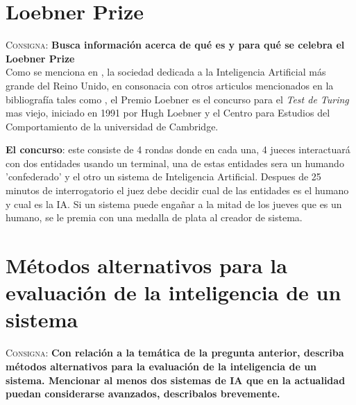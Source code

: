 \documentclass{article}
\begin{document}
\section{Loebner Prize}
\label{sec:lp}
\textsc{Consigna}: \textbf{Busca informaci\'on acerca de qu\'e es y para qu\'e se celebra el Loebner Prize}\\

Como se menciona en \cite{loebner1}, la sociedad dedicada a la Inteligencia Artificial m\'as grande del Reino Unido, en consonacia con otros articulos mencionados en la bibliograf\'ia tales como \cite{loebner2} \cite{loebner3}, el Premio Loebner es el concurso para el \textit{Test de Turing} mas viejo, iniciado en 1991 por Hugh Loebner y el Centro para Estudios del Comportamiento de la universidad de Cambridge.

\textbf{El concurso}: este consiste de 4 rondas donde en cada una, 4 jueces interactuar\'a con dos entidades usando un terminal, una de estas entidades sera un humando 'confederado' y el otro un sistema de Inteligencia Artificial. Despues de 25 minutos de interrogatorio el juez debe decidir cual de las entidades es el humano y cual es la IA. Si un sistema puede enga\~nar a la mitad de los jueves que es un humano, se le premia con una medalla de plata al creador de sistema.


\section{M\'etodos alternativos para la evaluaci\'on de la inteligencia de un sistema}
\textsc{Consigna}: \textbf{Con relaci\'on a la tem\'atica de la pregunta anterior, describa m\'etodos alternativos para la evaluaci\'on de la inteligencia de un sistema. Mencionar al menos dos sistemas de IA que en la actualidad puedan considerarse avanzados, describalos brevemente.}
\end{document}
